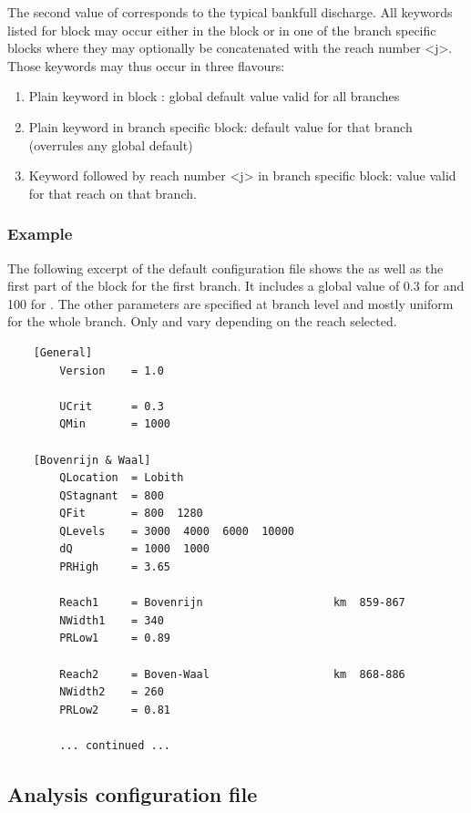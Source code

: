 The second value of  corresponds to the typical bankfull discharge.
All keywords listed for block \keyw{*} may occur either in the \keyw{[General]} block or in one of the branch specific blocks where they may optionally be concatenated with the reach number <j>.
Those keywords may thus occur in three flavours:

\begin{enumerate}
\item Plain keyword in block \keyw{[General]}: global default value valid for all branches
\item Plain keyword in branch specific block: default value for that branch (overrules any global default)
\item Keyword followed by reach number <j> in branch specific block: value valid for that reach on that branch.
\end{enumerate}

\subsubsection*{Example}

The following excerpt of the default  configuration file shows the \keyw{[General]} as well as the first part of the  block for the first branch.
It includes a global value of 0.3 for  and 100 for .
The other parameters are specified at branch level and mostly uniform for the whole branch.
Only  and  vary depending on the reach selected.

\begin{Verbatim}
    [General]
        Version    = 1.0

        UCrit      = 0.3
        QMin       = 1000

    [Bovenrijn & Waal]
        QLocation  = Lobith
        QStagnant  = 800
        QFit       = 800  1280
        QLevels    = 3000  4000  6000  10000
        dQ         = 1000  1000
        PRHigh     = 3.65
        
        Reach1     = Bovenrijn                    km  859-867
        NWidth1    = 340
        PRLow1     = 0.89
        
        Reach2     = Boven-Waal                   km  868-886
        NWidth2    = 260
        PRLow2     = 0.81

        ... continued ...
\end{Verbatim}

\subsection{Analysis configuration file}\label{app-v1:config}

